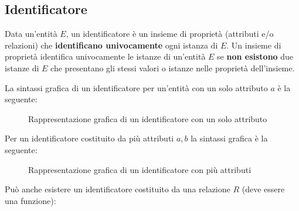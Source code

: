 \documentclass[a4paper,twoside]{article}
\begin{document}
\subsection{Identificatore}
Data un'entità \( E \), un identificatore è un insieme di proprietà (attributi e/o relazioni)
che \textbf{identificano univocamente} ogni istanza di \( E \). Un insieme di proprietà
identifica univocamente le istanze di un'entità \( E \) se \textbf{non esistono} due
istanze di \( E \) che presentano gli stessi valori o istanze nelle proprietà dell'insieme.

\vspace{1em}
\noindent
La sintassi grafica di un identificatore per un'entità con un solo attributo \( a \) è
la seguente:
\begin{figure}[H]
  \centering
  \caption{Rappresentazione grafica di un identificatore con un solo attributo}
\end{figure}
\noindent
Per un identificatore costituito da più attributi \( a, b \) la sintassi grafica è la seguente:
\begin{figure}[H]
  \centering
  \caption{Rappresentazione grafica di un identificatore con più attributi}
\end{figure}
\noindent
Può anche esistere un identificatore costituito da una relazione \( R \) (deve essere
una funzione):
\end{document}
